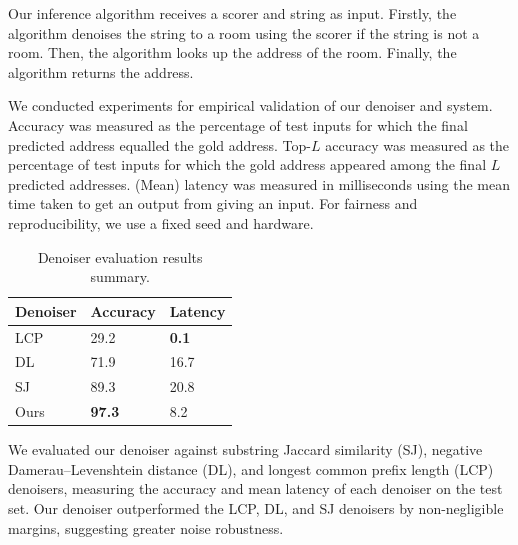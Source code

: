 \documentclass{article}
\theoremstyle{definition}
\begin{document}
Our inference algorithm receives a scorer and string as input.
Firstly, the algorithm denoises the string to a room using the scorer if the string is not a room.
Then, the algorithm looks up the address of the room.
Finally, the algorithm returns the address.

\newpage

We conducted experiments for empirical validation of our denoiser and system.
Accuracy was measured as the percentage of test inputs for which the final predicted address equalled the gold address.
Top-$L$ accuracy was measured as the percentage of test inputs for which the gold address appeared among the final $L$ predicted addresses.
(Mean) latency was measured in milliseconds using the mean time taken to get an output from giving an input.
For fairness and reproducibility, we use a fixed seed and hardware.

\begin{table}[H]
	\centering
	\begin{tabular}{lll}
		\toprule
		\textbf{Denoiser} & \textbf{Accuracy} & \textbf{Latency} \\
		\midrule
		LCP & 29.2 & \textbf{0.1} \\
		DL & 71.9 & 16.7 \\
		SJ & 89.3 & 20.8 \\
		Ours & \textbf{97.3} & 8.2 \\
		\bottomrule
	\end{tabular}
	\caption{Denoiser evaluation results summary.}
\end{table}

We evaluated our denoiser against
substring Jaccard similarity (SJ),
negative Damerau--Levenshtein distance (DL),
and
longest common prefix length (LCP)
denoisers,
measuring the accuracy and mean latency of each denoiser on the test set.
Our denoiser outperformed the LCP, DL, and SJ denoisers by non-negligible margins,
suggesting greater noise robustness.
\end{document}
